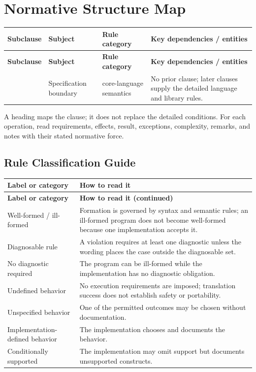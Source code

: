 \documentclass[11pt,letterpaper]{article}
\begin{document}
\section{Normative Structure Map}
\small\begin{longtable}{@{}>{\RaggedRight\arraybackslash}p{}>{\RaggedRight\arraybackslash}p{}>{\RaggedRight\arraybackslash}p{}>{\RaggedRight\arraybackslash}p{}@{}}
\toprule\textbf{Subclause} & \textbf{Subject} & \textbf{Rule category} & \textbf{Key dependencies / entities}\\\midrule\endfirsthead
\toprule\textbf{Subclause} & \textbf{Subject} & \textbf{Rule category} & \textbf{Key dependencies / entities}\\\midrule\endhead
\bottomrule\endfoot
1.1 & Specification boundary & core-language semantics & No prior clause; later clauses supply the detailed language and library rules.\\
\end{longtable}\normalsize
\begin{CornellReferenceNormativeBox}A heading maps the clause; it does not replace the detailed conditions. For each operation, read requirements, effects, result, exceptions, complexity, remarks, and notes with their stated normative force.\end{CornellReferenceNormativeBox}
\subsection*{Rule Classification Guide}
\small\begin{longtable}{@{}>{\RaggedRight\arraybackslash}p{}>{\RaggedRight\arraybackslash}p{}@{}}\toprule\textbf{Label or category} & \textbf{How to read it}\\\midrule\endfirsthead\toprule\textbf{Label or category} & \textbf{How to read it (continued)}\\\midrule\endhead\bottomrule\endfoot
Well-formed / ill-formed & Formation is governed by syntax and semantic rules; an ill-formed program does not become well-formed because one implementation accepts it.\\
Diagnosable rule & A violation requires at least one diagnostic unless the wording places the case outside the diagnosable set.\\
No diagnostic required & The program can be ill-formed while the implementation has no diagnostic obligation.\\
Undefined behavior & No execution requirements are imposed; translation success does not establish safety or portability.\\
Unspecified behavior & One of the permitted outcomes may be chosen without documentation.\\
Implementation-defined behavior & The implementation chooses and documents the behavior.\\
Conditionally supported & The implementation may omit support but documents unsupported constructs.\\
\end{longtable}\normalsize
\end{document}
